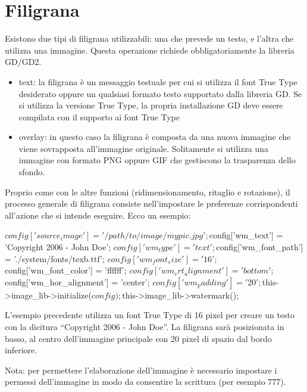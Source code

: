 \section*{Filigrana}
Esistono due tipi di filigrana utilizzabili: una che prevede un testo, e l'altra che utilizza una immagine. Questa operazione richiede obbligatoriamente la libreria GD/GD2.

\begin{itemize}
\item text: la filigrana è un messaggio testuale per cui si utilizza il font True Type desiderato oppure un qualsiasi formato testo supportato dalla libreria GD. Se si utilizza la versione True Type, la propria installazione GD deve essere compilata con il supporto ai font True Type
\item overlay: in questo caso la filigrana è composta da una nuova immagine che viene sovrapposta all'immagine originale. Solitamente si utilizza una immagine con formato PNG oppure GIF che gestiscono la trasparenza dello sfondo.
\end{itemize}

Proprio come con le altre funzioni (ridimensionamento, ritaglio e rotazione), il processo generale di filigrana consiste nell'impostare le preferenze corrispondenti all'azione che si intende eseguire. Ecco un esempio:

\begin{code}
$config['source_image']	= '/path/to/image/mypic.jpg';
$config['wm_text'] = 'Copyright 2006 - John Doe';
$config['wm_type'] = 'text';
$config['wm_font_path'] = './system/fonts/texb.ttf';
$config['wm_font_size']	= '16';
$config['wm_font_color'] = 'ffffff';
$config['wm_vrt_alignment'] = 'bottom';
$config['wm_hor_alignment'] = 'center';
$config['wm_padding'] = '20';

$this->image_lib->initialize($config); 

$this->image_lib->watermark();
\end{code}

L'esempio precedente utilizza un font True Type di 16 pixel per creare un testo con la dicitura ``Copyright 2006 - John Doe''. La filigrana sarà posizionata in basso, al centro dell'immagine principale con 20 pixel di spazio dal bordo inferiore.

Nota: per permettere l'elaborazione dell'immagine è necessario impostare i permessi dell'immagine in modo da consentire la scrittura (per esempio 777).

